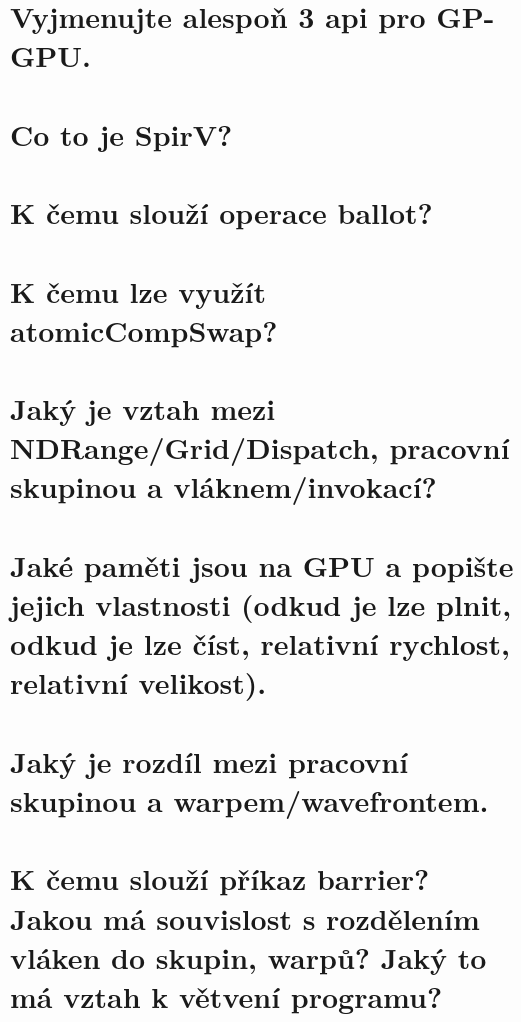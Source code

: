 \section{Vyjmenujte alespoň 3 api pro GP-GPU.}
	\todo


\section{Co to je SpirV?}
	\todo


\section{K čemu slouží operace ballot?}
	\todo


\section{K čemu lze využít atomicCompSwap?}
	\todo


\section{Jaký je vztah mezi NDRange/Grid/Dispatch, pracovní skupinou a vláknem/invokací?}
	\todo


\section{Jaké paměti jsou na GPU a popište jejich vlastnosti (odkud je lze plnit, odkud je lze číst, relativní rychlost, relativní velikost).}
	\todo


\section{Jaký je rozdíl mezi pracovní skupinou a warpem/wavefrontem.}
	\todo


\section{K čemu slouží příkaz barrier? Jakou má souvislost s rozdělením vláken do skupin, warpů? Jaký to má vztah k větvení programu?}
	\todo


	
          
